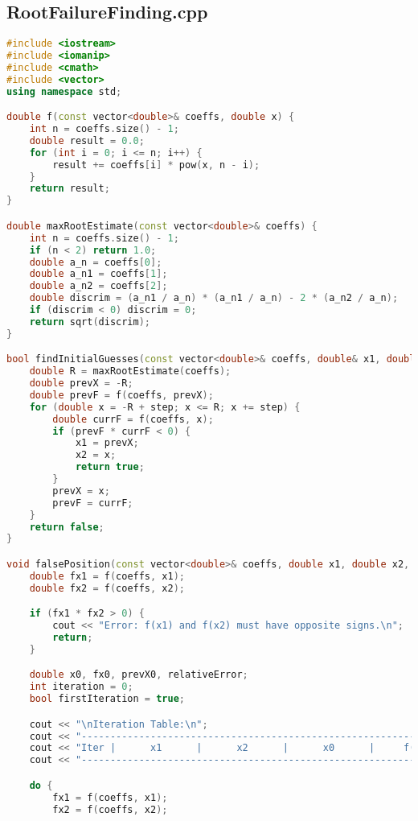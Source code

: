 \documentclass[12pt,a4paper]{article}
\begin{document}
\subsection{RootFailureFinding.cpp}
\begin{lstlisting}[language=C++, caption={False Position Method for General Polynomials}, label={lst:falseposition}]
#include <iostream>
#include <iomanip>
#include <cmath>
#include <vector>
using namespace std;

double f(const vector<double>& coeffs, double x) {
    int n = coeffs.size() - 1;
    double result = 0.0;
    for (int i = 0; i <= n; i++) {
        result += coeffs[i] * pow(x, n - i);
    }
    return result;
}

double maxRootEstimate(const vector<double>& coeffs) {
    int n = coeffs.size() - 1;
    if (n < 2) return 1.0;
    double a_n = coeffs[0];
    double a_n1 = coeffs[1];
    double a_n2 = coeffs[2];
    double discrim = (a_n1 / a_n) * (a_n1 / a_n) - 2 * (a_n2 / a_n);
    if (discrim < 0) discrim = 0;
    return sqrt(discrim);
}

bool findInitialGuesses(const vector<double>& coeffs, double& x1, double& x2, double step = 0.1) {
    double R = maxRootEstimate(coeffs);
    double prevX = -R;
    double prevF = f(coeffs, prevX);
    for (double x = -R + step; x <= R; x += step) {
        double currF = f(coeffs, x);
        if (prevF * currF < 0) {
            x1 = prevX;
            x2 = x;
            return true;
        }
        prevX = x;
        prevF = currF;
    }
    return false;
}

void falsePosition(const vector<double>& coeffs, double x1, double x2, double tolerance, int maxIterations) {
    double fx1 = f(coeffs, x1);
    double fx2 = f(coeffs, x2);

    if (fx1 * fx2 > 0) {
        cout << "Error: f(x1) and f(x2) must have opposite signs.\n";
        return;
    }

    double x0, fx0, prevX0, relativeError;
    int iteration = 0;
    bool firstIteration = true;

    cout << "\nIteration Table:\n";
    cout << "-------------------------------------------------------------------------------\n";
    cout << "Iter |      x1      |      x2      |      x0      |     f(x0)    | Relative Error\n";
    cout << "-------------------------------------------------------------------------------\n";

    do {
        fx1 = f(coeffs, x1);
        fx2 = f(coeffs, x2);


\end{lstlisting}
\end{document}
